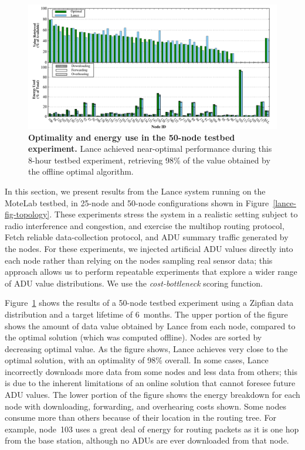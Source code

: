 \begin{figure}[t]
\begin{center}
\includegraphics[width=1.0\hsize]{./4-lance/figs/big.pdf}
\end{center}

\caption{\textbf{Optimality and energy use in the 50-node testbed
experiment.} Lance achieved near-optimal performance during this 8-hour
testbed experiment, retrieving 98\% of the value obtained by the offline
optimal algorithm.}

\label{lance-fig-big}
\end{figure}

In this section, we present results from the Lance system running on the
MoteLab testbed, in 25-node and 50-node configurations shown in
Figure~\ref{lance-fig-topology}. These experiments stress the system in a
realistic setting subject to radio interference and congestion, and exercise
the multihop routing protocol, Fetch reliable data-collection protocol, and
ADU summary traffic generated by the nodes. For these experiments, we
injected artificial ADU values directly into each node rather than relying on
the nodes sampling real sensor data; this approach allows us to perform
repeatable experiments that explore a wider range of ADU value distributions.
We use the \textit{cost-bottleneck} scoring function.

Figure~\ref{lance-fig-big} shows the results of a 50-node testbed experiment
using a Zipfian data distribution and a target lifetime of 6~months. The
upper portion of the figure shows the amount of data value obtained by Lance
from each node, compared to the optimal solution (which was computed
offline). Nodes are sorted by decreasing optimal value. As the figure shows,
Lance achieves very close to the optimal solution, with an optimality of 98\%
overall. In some cases, Lance incorrectly downloads more data from some nodes
and less data from others; this is due to the inherent limitations of an
online solution that cannot foresee future ADU values. The lower portion of
the figure shows the energy breakdown for each node with downloading,
forwarding, and overhearing costs shown. Some nodes consume more than others
because of their location in the routing tree. For example, node~103 uses a
great deal of energy for routing packets as it is one hop from the base
station, although no ADUs are ever downloaded from that node.

